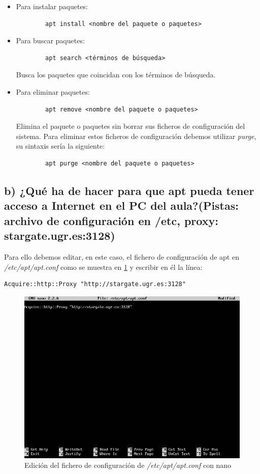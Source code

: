\begin{itemize}
	\item{Para instalar paquetes: \begin{verbatim}
		apt install <nombre del paquete o paquetes>
		\end{verbatim}
	}
	\item{Para buscar paquetes: \begin{verbatim}
		apt search <términos de búsqueda>
		\end{verbatim}
		Busca los paquetes que coincidan con los términos de búsqueda.
	}
	\item{Para eliminar paquetes: \begin{verbatim}
		apt remove <nombre del paquete o paquetes>
		\end{verbatim}
		Elimina el paquete o paquetes sin borrar sus ficheros de configuración del sistema.
		Para eliminar estos ficheros de configuración debemos utilizar \textit{purge}, su sintaxis sería la siguiente: \cite{apt-get}
		\begin{verbatim}
		apt purge <nombre del paquete o paquetes>
		\end{verbatim}
	}
\end{itemize}

\subsection{b) ¿Qué ha de hacer para que apt pueda tener acceso a Internet en el PC del aula?(Pistas: archivo de configuración en /etc, proxy: stargate.ugr.es:3128)}

Para ello debemos editar, en este caso, el fichero de configuración de apt en \textit{/etc/apt/apt.conf} como se muestra en \ref{ise3} \cite{proxy-apt} y escribir en él la línea:
\begin{verbatim}
Acquire::http::Proxy "http://stargate.ugr.es:3128"
\end{verbatim}

\begin{figure}[H]
	\centering
	\includegraphics[scale=0.6]{ise3.png}
	\caption{Edición del fichero de configuración de \textit{/etc/apt/apt.conf} con nano} \label{ise3}
\end{figure}

